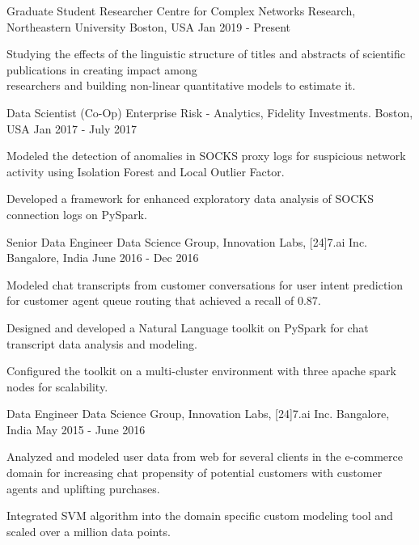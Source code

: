 \begin{cventries}
  \cventry
    {Graduate Student Researcher}
    {Centre for Complex Networks Research, Northeastern University}
    {Boston, USA}
    {Jan 2019 - Present}
    {
      \begin{cvitems}
        \item {Studying the effects of the linguistic structure of titles and abstracts of scientific publications in creating impact among \\ researchers and building non-linear quantitative models to estimate it.}
        \end{cvitems}
    }
  \cventry
    {Data Scientist (Co-Op)}
    {Enterprise Risk - Analytics, Fidelity Investments.}
    {Boston, USA}
    {Jan 2017 - July 2017}
    {
      \begin{cvitems}
        \item {Modeled the detection of anomalies in SOCKS proxy logs for suspicious network activity using Isolation Forest and Local Outlier Factor.}
        \item {Developed a framework for enhanced exploratory data analysis of SOCKS connection logs on PySpark.}
      \end{cvitems}
    }
  \cventry
    {Senior Data Engineer}
    {Data Science Group, Innovation Labs, [24]7.ai Inc.}
    {Bangalore, India}
    {June 2016 - Dec 2016}
    {
      \begin{cvitems}
        \item {Modeled chat transcripts from customer conversations for user intent prediction for customer agent queue routing that achieved a recall of 0.87.}
        \item {Designed and developed a Natural Language toolkit on PySpark for chat transcript data analysis and modeling.}
        \item {Configured the toolkit on a multi-cluster environment with three apache spark nodes for scalability.}
      \end{cvitems}
    }
  \cventry
    {Data Engineer}
    {Data Science Group, Innovation Labs, [24]7.ai Inc.}  
    {Bangalore, India}
    {May 2015 - June 2016}
    {
      \begin{cvitems}
        \item {Analyzed and modeled user data from web for several clients in the e-commerce domain for increasing chat propensity of potential customers with customer agents and uplifting purchases.}
        \item {Integrated SVM algorithm into the domain specific custom modeling tool and scaled over a million data points.}

\end{cvitems}}
\end{cventries}
